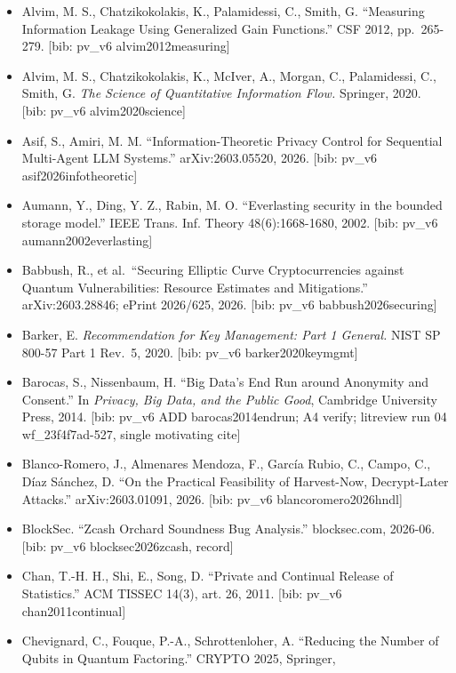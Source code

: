 \documentclass[
  11pt,
]{article}
\providecommand{\tightlist}{%
  \setlength{\itemsep}{0pt}\setlength{\parskip}{0pt}}
\begin{document}
\begin{itemize}
\tightlist
\item
  Alvim, M. S., Chatzikokolakis, K., Palamidessi, C., Smith, G.
  ``Measuring Information Leakage Using Generalized Gain Functions.''
  CSF 2012, pp.~265-279. {[}bib: pv\_v6 alvim2012measuring{]}
\item
  Alvim, M. S., Chatzikokolakis, K., McIver, A., Morgan, C.,
  Palamidessi, C., Smith, G. \emph{The Science of Quantitative
  Information Flow.} Springer, 2020. {[}bib: pv\_v6 alvim2020science{]}
\item
  Asif, S., Amiri, M. M. ``Information-Theoretic Privacy Control for
  Sequential Multi-Agent LLM Systems.'' arXiv:2603.05520, 2026. {[}bib:
  pv\_v6 asif2026infotheoretic{]}
\item
  Aumann, Y., Ding, Y. Z., Rabin, M. O. ``Everlasting security in the
  bounded storage model.'' IEEE Trans. Inf. Theory 48(6):1668-1680,
  2002. {[}bib: pv\_v6 aumann2002everlasting{]}
\item
  Babbush, R., et al.~``Securing Elliptic Curve Cryptocurrencies against
  Quantum Vulnerabilities: Resource Estimates and Mitigations.''
  arXiv:2603.28846; ePrint 2026/625, 2026. {[}bib: pv\_v6
  babbush2026securing{]}
\item
  Barker, E. \emph{Recommendation for Key Management: Part 1 General.}
  NIST SP 800-57 Part 1 Rev.~5, 2020. {[}bib: pv\_v6
  barker2020keymgmt{]}
\item
  Barocas, S., Nissenbaum, H. ``Big Data's End Run around Anonymity and
  Consent.'' In \emph{Privacy, Big Data, and the Public Good}, Cambridge
  University Press, 2014. {[}bib: pv\_v6 ADD barocas2014endrun; A4
  verify; litreview run 04 wf\_23f4f7ad-527, single motivating cite{]}
\item
  Blanco-Romero, J., Almenares Mendoza, F., García Rubio, C., Campo, C.,
  Díaz Sánchez, D. ``On the Practical Feasibility of Harvest-Now,
  Decrypt-Later Attacks.'' arXiv:2603.01091, 2026. {[}bib: pv\_v6
  blancoromero2026hndl{]}
\item
  BlockSec. ``Zcash Orchard Soundness Bug Analysis.'' blocksec.com,
  2026-06. {[}bib: pv\_v6 blocksec2026zcash, record{]}
\item
  Chan, T.-H. H., Shi, E., Song, D. ``Private and Continual Release of
  Statistics.'' ACM TISSEC 14(3), art. 26, 2011. {[}bib: pv\_v6
  chan2011continual{]}
\item
  Chevignard, C., Fouque, P.-A., Schrottenloher, A. ``Reducing the
  Number of Qubits in Quantum Factoring.'' CRYPTO 2025, Springer,

\end{itemize}
\end{document}
